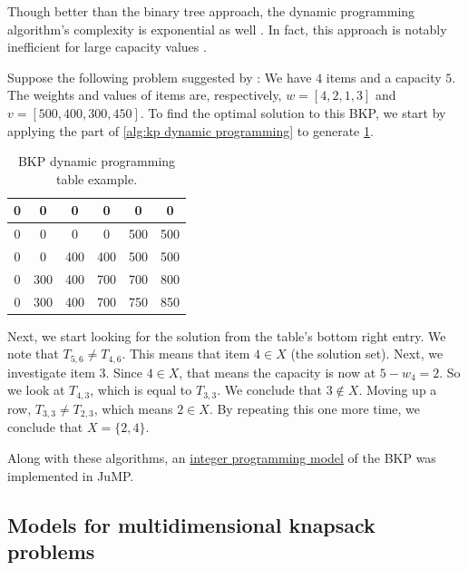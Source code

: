 Though better than the binary tree approach, the dynamic programming algorithm's complexity is exponential as well \cite{FEOFILOFF2020a}. In fact, this approach is notably inefficient for large capacity values \cite{HRISTAKEVA2005}.

\begin{example}
    Suppose the following problem suggested by \textcite{FEOFILOFF2020a}: We have $4$ items and a capacity $5$. The weights and values of items are, respectively, $w = [4, 2, 1, 3]$ and $v = [500, 400, 300, 450]$. To find the optimal solution to this BKP, we start by applying the part of \cref{alg:kp dynamic programming} to generate \cref{tab:kp dynamic programming table}.

    \begin{table}[h]
        \centering
        \caption{BKP dynamic programming table example.}
        \label{tab:kp dynamic programming table}
        \begin{tabular}{|c c c c c c|}
            \hline
            0 & 0 & 0 & 0 & 0 & 0\\
            \hline
            0 & 0 & 0 & 0 & 500 & 500\\
            \hline
            0 & 0 & 400 & 400 & 500 & 500\\
            \hline
            0 & 300 & 400 & 700 & 700 & 800\\
            \hline
            0 & 300 & 400 & 700 & 750 & 850\\
            \hline
        \end{tabular}
    \end{table}

    Next, we start looking for the solution from the table's bottom right entry. We note that $T_{5,6} \neq T_{4,6}$. This means that item $4 \in X$ (the solution set). Next, we investigate item $3$. Since $4 \in X$, that means the capacity is now at $5 - w_4 = 2$. So we look at $T_{4,3}$, which is equal to $T_{3,3}$. We conclude that $3 \notin X$. Moving up a row, $T_{3,3} \neq T_{2,3}$, which means $2 \in X$. By repeating this one more time, we conclude that $X = \{2,4\}$.
\end{example}

Along with these algorithms, an \href{https://github.com/phcentenaro7/IC-Knapsack/blob/main/Knapsack/Misc/1DKP.jl}{integer programming model} of the BKP was implemented in JuMP.

\subsection{Models for multidimensional knapsack problems}

